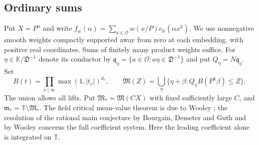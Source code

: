\documentclass[11pt,letterpaper]{article}
\theoremstyle{definition}
\numberwithin{equation}{section}
\begin{document}
\subsection{Ordinary sums}
Put $X=P^n$ and write
$f_w(\alpha)=\sum_{x\in\mathcal O}w(x/P)e_{\mathbb K}(\alpha x^k)$.
We use nonnegative smooth weights compactly supported away from zero
at each embedding, with positive real coordinates. Sums of finitely
many product weights suffice. For $\eta\in\mathbb K/\mathfrak D^{-1}$
denote its conductor by $\mathfrak q_\eta
=\{a\in\mathcal O:a\eta\in\mathfrak D^{-1}\}$ and put
$Q_\eta=N\mathfrak q_\eta$. Set
\[
 B(t)=\prod_{v\mid\infty}\max(1,|t_v|)^{d_v},\qquad
 \mathfrak M(Z)=\bigcup_{\eta}
 \{\eta+\beta: Q_\eta B(P^k\beta)\le Z\}.
\]
The union allows all lifts. Put $\mathfrak M_*=\mathfrak M(CX)$
with fixed sufficiently large $C$, and
$\mathfrak m_*=\mathbb T\setminus\mathfrak M_*$. The field
critical mean-value theorem is due to Wooley
\cite[Theorem~15.1 and Corollary~15.3]{NFWooley}; the resolution
of the rational main conjecture by Bourgain, Demeter and Guth
\cite{NFBDG} and by Wooley concerns the full coefficient system.
Here the leading coefficient alone is integrated on $\mathbb T$.
\end{document}
